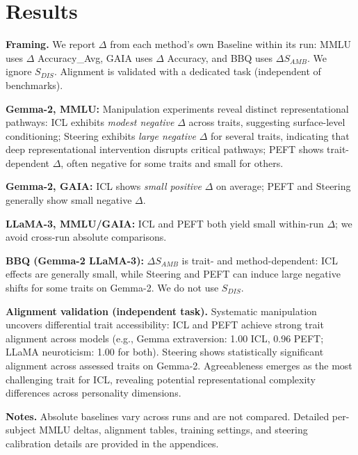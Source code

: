 \section{Results}

\textbf{Framing.} We report \(\Delta\) from each method's own Baseline within its run: MMLU uses \(\Delta\) Accuracy\_Avg, GAIA uses \(\Delta\) Accuracy, and BBQ uses \(\Delta S_{AMB}\). We ignore \(S_{DIS}\). Alignment is validated with a dedicated task (independent of benchmarks).

\textbf{Gemma-2, MMLU:} Manipulation experiments reveal distinct representational pathways: ICL exhibits \emph{modest negative} \(\Delta\) across traits, suggesting surface-level conditioning; Steering exhibits \emph{large negative} \(\Delta\) for several traits, indicating that deep representational intervention disrupts critical pathways; PEFT shows trait-dependent \(\Delta\), often negative for some traits and small for others.


\textbf{Gemma-2, GAIA:} ICL shows \emph{small positive} \(\Delta\) on average; PEFT and Steering generally show small negative \(\Delta\).


\textbf{LLaMA-3, MMLU/GAIA:} ICL and PEFT both yield small within-run \(\Delta\); we avoid cross-run absolute comparisons.


\textbf{BBQ (Gemma-2 \/ LLaMA-3):} \(\Delta S_{AMB}\) is trait- and method-dependent: ICL effects are generally small, while Steering and PEFT can induce large negative shifts for some traits on Gemma-2. We do not use \(S_{DIS}\).

\textbf{Alignment validation (independent task).} Systematic manipulation uncovers differential trait accessibility: ICL and PEFT achieve strong trait alignment across models (e.g., Gemma extraversion: 1.00 ICL, 0.96 PEFT; LLaMA neuroticism: 1.00 for both). Steering shows statistically significant alignment across assessed traits on Gemma-2. Agreeableness emerges as the most challenging trait for ICL, revealing potential representational complexity differences across personality dimensions.


\textbf{Notes.} Absolute baselines vary across runs and are not compared. Detailed per-subject MMLU deltas, alignment tables, training settings, and steering calibration details are provided in the appendices.